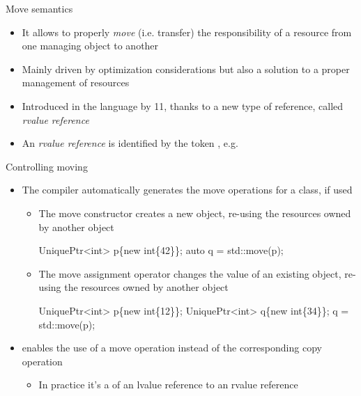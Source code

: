 \begin{frame}{Move semantics}

  \begin{itemize}
  \item It allows to properly \textit{move} (i.e. transfer) the responsibility
    of a resource from one managing object to another
  \item Mainly driven by optimization considerations but also a solution to
    a proper management of resources
  \item Introduced in the language by \Cpp{}11, thanks to a new type of reference,
    called \textit{rvalue reference}
  \item An \textit{rvalue reference} is identified by the token \code{\&\&}, e.g.
  \end{itemize}

\end{frame}

\begin{frame}[fragile]{Controlling moving}
  \begin{itemize}
  \item<1-> The compiler automatically generates the move operations for a class, if
    used
    \begin{itemize}
    \item The move constructor creates a \alert{new} object, \alert{re-using} the
      resources owned by another object

      \begin{codeblock}
UniquePtr<int> p\{new int\{42\}\};
auto q = std::move(p);\end{codeblock}

     \item The move assignment operator changes the value of an \alert{existing}
       object, \alert{re-using} the resources owned by another object

      \begin{codeblock}
UniquePtr<int> p\{new int\{12\}\};
UniquePtr<int> q\{new int\{34\}\};
q = std::move(p);\end{codeblock}

     \end{itemize}
   \item<2->  enables the use of a move operation instead of the
     corresponding copy operation
     \begin{itemize}
     \item In practice it's a  of an lvalue reference to an
       rvalue reference
     \end{itemize}
  \end{itemize}
\end{frame}

